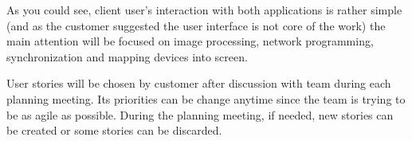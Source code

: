 As you could see, client user's interaction with both applications is rather simple (and as the customer suggested the user interface is not core of the work) the main attention will be focused on image processing, network programming, synchronization and mapping devices into screen.

User stories will be chosen by customer after discussion with team during each planning meeting.
Its priorities can be change anytime since the team is trying to be as agile as possible.
During the planning meeting, if needed, new stories can be created or some stories can be discarded.

